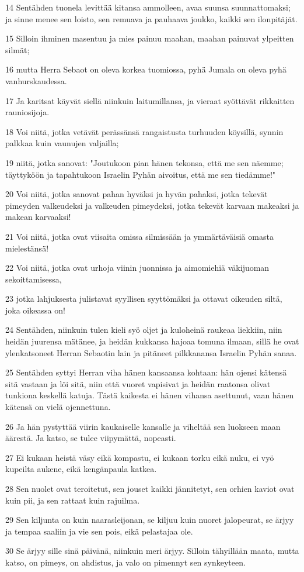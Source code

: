 \par 14 Sentähden tuonela levittää kitansa ammolleen, avaa suunsa suunnattomaksi; ja sinne menee sen loisto, sen remuava ja pauhaava joukko, kaikki sen ilonpitäjät.
\par 15 Silloin ihminen masentuu ja mies painuu maahan, maahan painuvat ylpeitten silmät;
\par 16 mutta Herra Sebaot on oleva korkea tuomiossa, pyhä Jumala on oleva pyhä vanhurskaudessa.
\par 17 Ja karitsat käyvät siellä niinkuin laitumillansa, ja vieraat syöttävät rikkaitten rauniosijoja.
\par 18 Voi niitä, jotka vetävät perässänsä rangaistusta turhuuden köysillä, synnin palkkaa kuin vaunujen valjailla;
\par 19 niitä, jotka sanovat: "Joutukoon pian hänen tekonsa, että me sen näemme; täyttyköön ja tapahtukoon Israelin Pyhän aivoitus, että me sen tiedämme!"
\par 20 Voi niitä, jotka sanovat pahan hyväksi ja hyvän pahaksi, jotka tekevät pimeyden valkeudeksi ja valkeuden pimeydeksi, jotka tekevät karvaan makeaksi ja makean karvaaksi!
\par 21 Voi niitä, jotka ovat viisaita omissa silmissään ja ymmärtäväisiä omasta mielestänsä!
\par 22 Voi niitä, jotka ovat urhoja viinin juonnissa ja aimomiehiä väkijuoman sekoittamisessa,
\par 23 jotka lahjuksesta julistavat syyllisen syyttömäksi ja ottavat oikeuden siltä, joka oikeassa on!
\par 24 Sentähden, niinkuin tulen kieli syö oljet ja kuloheinä raukeaa liekkiin, niin heidän juurensa mätänee, ja heidän kukkansa hajoaa tomuna ilmaan, sillä he ovat ylenkatsoneet Herran Sebaotin lain ja pitäneet pilkkanansa Israelin Pyhän sanaa.
\par 25 Sentähden syttyi Herran viha hänen kansaansa kohtaan: hän ojensi kätensä sitä vastaan ja löi sitä, niin että vuoret vapisivat ja heidän raatonsa olivat tunkiona keskellä katuja. Tästä kaikesta ei hänen vihansa asettunut, vaan hänen kätensä on vielä ojennettuna.
\par 26 Ja hän pystyttää viirin kaukaiselle kansalle ja viheltää sen luokseen maan äärestä. Ja katso, se tulee viipymättä, nopeasti.
\par 27 Ei kukaan heistä väsy eikä kompastu, ei kukaan torku eikä nuku, ei vyö kupeilta aukene, eikä kengänpaula katkea.
\par 28 Sen nuolet ovat teroitetut, sen jouset kaikki jännitetyt, sen orhien kaviot ovat kuin pii, ja sen rattaat kuin rajuilma.
\par 29 Sen kiljunta on kuin naarasleijonan, se kiljuu kuin nuoret jalopeurat, se ärjyy ja tempaa saaliin ja vie sen pois, eikä pelastajaa ole.
\par 30 Se ärjyy sille sinä päivänä, niinkuin meri ärjyy. Silloin tähyillään maata, mutta katso, on pimeys, on ahdistus, ja valo on pimennyt sen synkeyteen.

